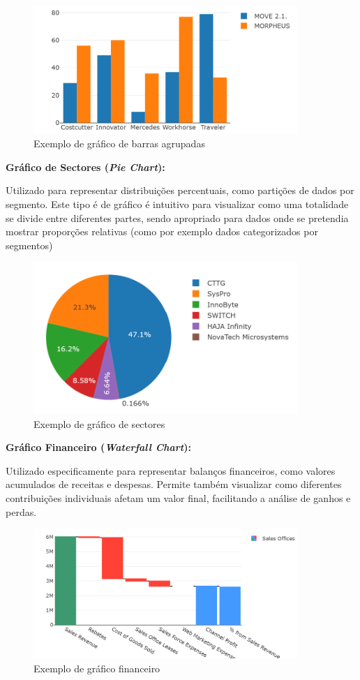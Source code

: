 \begin{figure}[H]
\centering
\includegraphics[max width=10cm]{./img/agrupada}
\caption{Exemplo de gráfico de barras agrupadas}
\end{figure}

\textbf{Gráfico de Sectores (\textit{Pie Chart}):}  

Utilizado para representar distribuições percentuais, como partições de dados por segmento. Este tipo é de gráfico é intuitivo para visualizar como uma totalidade se divide entre diferentes partes, sendo apropriado para dados onde se pretendia mostrar proporções relativas (como por exemplo dados categorizados por segmentos)

\begin{figure}[H]
    \centering
    \includegraphics[max width=10cm]{./img/pie}
    \caption{Exemplo de gráfico de sectores}
\end{figure}

\textbf{Gráfico Financeiro (\textit{Waterfall Chart}):}  

Utilizado especificamente para representar balanços financeiros, como valores acumulados de receitas e despesas. Permite também visualizar como diferentes contribuições individuais afetam um valor final, facilitando a análise de ganhos e perdas.

\begin{figure}[H]
    \centering
    \includegraphics[max width=10cm]{./img/waterfall}
    \caption{Exemplo de gráfico financeiro}
\end{figure}

